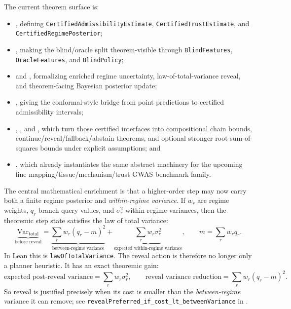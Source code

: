 \documentclass[11pt,openany]{report}
\begin{document}
The current theorem surface is:
\begin{itemize}
\item {},
  defining \texttt{CertifiedAdmissibilityEstimate},
  \texttt{CertifiedTrustEstimate}, and
  \texttt{CertifiedRegimePosterior};
\item {},
  making the blind/oracle split theorem-visible through
  \texttt{BlindFeatures}, \texttt{OracleFeatures}, and
  \texttt{BlindPolicy};
\item {} and
  ,
  formalizing enriched regime uncertainty, law-of-total-variance reveal, and
  theorem-facing Bayesian posterior update;
\item {},
  giving the conformal-style bridge from point predictions to certified
  admissibility intervals;
\item {},
  , and
  ,
  which turn those certified interfaces into compositional chain bounds,
  continue/reveal/fallback/abstain theorems, and optional stronger
  root-sum-of-squares bounds under explicit assumptions; and
\item {}, which already
  instantiates the same abstract machinery for the upcoming
  fine-mapping/tissue/mechanism/trust GWAS benchmark family.
\end{itemize}

The central mathematical enrichment is that a higher-order step may now carry
both a finite regime posterior and \emph{within-regime variance}.  If $w_r$ are
regime weights, $q_r$ branch query values, and $\sigma_r^2$ within-regime
variances, then the theoremic step state satisfies the law of total variance:
\[
  \underbrace{\mathrm{Var}_{\mathrm{total}}}_{\text{before reveal}}
  =
  \underbrace{\sum_r w_r (q_r - m)^2}_{\text{between-regime variance}}
  +
  \underbrace{\sum_r w_r \sigma_r^2}_{\text{expected within-regime variance}},
  \qquad
  m = \sum_r w_r q_r.
\]
In Lean this is \texttt{lawOfTotalVariance}.  The reveal action is therefore
no longer only a planner heuristic.  It has an exact theoremic gain:
\[
  \text{expected post-reveal variance}
  =
  \sum_r w_r \sigma_r^2,
  \qquad
  \text{reveal variance reduction}
  =
  \sum_r w_r (q_r - m)^2.
\]
So reveal is justified precisely when its cost is smaller than the
\emph{between-regime} variance it can remove; see
\texttt{revealPreferred\_if\_cost\_lt\_betweenVariance} in
.
\end{document}
